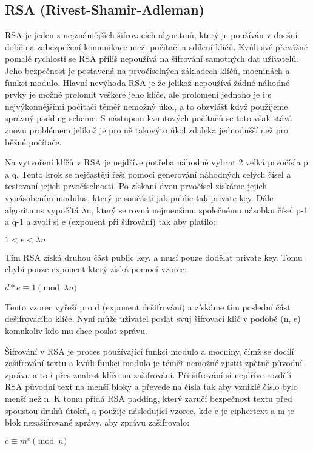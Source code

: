 \documentclass[12pt,a4paper]{report}
\begin{document}
\subsection{RSA (Rivest-Shamir-Adleman)}
RSA je jeden z nejznámějších šifrovacích algoritmů, který je používán v dnešní době na zabezpečení komunikace mezi počítači a sdílení klíčů. Kvůli své převážně pomalé rychlosti se RSA příliš nepoužívá na šifrování samotných dat uživatelů. Jeho bezpečnost je postavená na prvočíselných základech klíčů, mocninách a funkci modulo. Hlavní nevýhoda RSA je že jelikož nepoužívá žádné náhodné prvky je možné prolomit veškeré jeho klíče, ale prolomení jednoho je i s nejvýkonnějšími počítači téměř nemožný úkol, a to obzvlášť když použijeme správný padding scheme. S nástupem kvantových počítačů se toto však stává znovu problémem jelikož je pro ně takovýto úkol zdaleka jednodušší než pro běžné počítače.

Na vytvoření klíčů v RSA je nejdříve potřeba náhodně vybrat 2 velká prvočísla p a q. Tento krok se nejčastěji řeší pomocí generování náhodných celých čísel a testovaní jejich prvočíselnosti. Po získaní dvou prvočísel získáme jejich vynásobením modulus, který je součástí jak public tak private key. Dále algoritmus vypočítá $\lambda$n, který se rovná nejmenšímu společnému násobku čísel p-1 a q-1 a zvolí si e (exponent při šifrování) tak aby platilo:

$ 1 < e < \lambda n $

Tím RSA získá druhou část public key, a musí pouze dodělat private key. Tomu chybí pouze exponent který získá pomocí vzorce:

$ d*e \equiv 1 \pmod {\lambda n}$

Tento vzorec vyřeší pro d (exponent dešifrování) a získáme tím poslední část dešifrovacího klíče. Nyní může uživatel poslat svůj šifrovací klíč v podobě (n, e) komukoliv kdo mu chce poslat zprávu.

\newpage

Šifrování v RSA je proces používající funkci modulo a mocniny, čímž se docílí zašifrování textu a kvůli funkci modulo je téměř nemožné zjistit zpětně původní zprávu a to i přes znalost klíče na zašifrování. Při šifrování si nejdříve rozdělí RSA původní text na menší bloky a převede na čísla tak aby vzniklé číslo bylo menší než n. K tomu přidá RSA padding, který zaručí bezpečnost textu před spoustou druhů útoků, a použije následující vzorec, kde c je ciphertext a m je blok nezašifrované zprávy, aby zprávu zašifrovalo: 

$ c \equiv m^e \pmod n$
\end{document}
